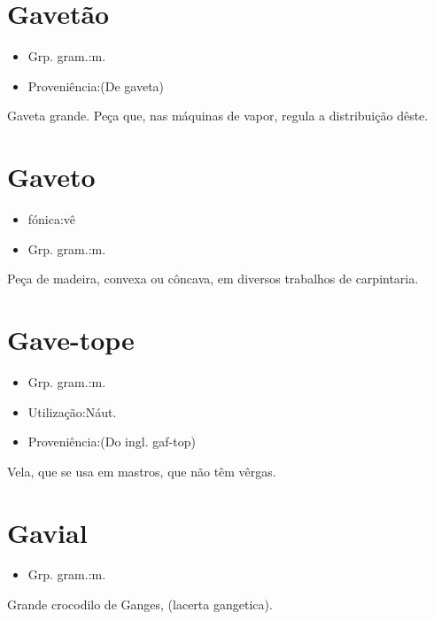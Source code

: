\section{Gavetão}
\begin{itemize}
\item {Grp. gram.:m.}
\end{itemize}
\begin{itemize}
\item {Proveniência:(De \textunderscore gaveta\textunderscore )}
\end{itemize}
Gaveta grande.
Peça que, nas máquinas de vapor, regula a distribuição dêste.
\section{Gaveto}
\begin{itemize}
\item {fónica:vê}
\end{itemize}
\begin{itemize}
\item {Grp. gram.:m.}
\end{itemize}
Peça de madeira, convexa ou côncava, em diversos trabalhos de carpintaria.
\section{Gave-tope}
\begin{itemize}
\item {Grp. gram.:m.}
\end{itemize}
\begin{itemize}
\item {Utilização:Náut.}
\end{itemize}
\begin{itemize}
\item {Proveniência:(Do ingl. \textunderscore gaf-top\textunderscore )}
\end{itemize}
Vela, que se usa em mastros, que não têm vêrgas.
\section{Gavial}
\begin{itemize}
\item {Grp. gram.:m.}
\end{itemize}
Grande crocodilo de Ganges, (\textunderscore lacerta gangetica\textunderscore ).
